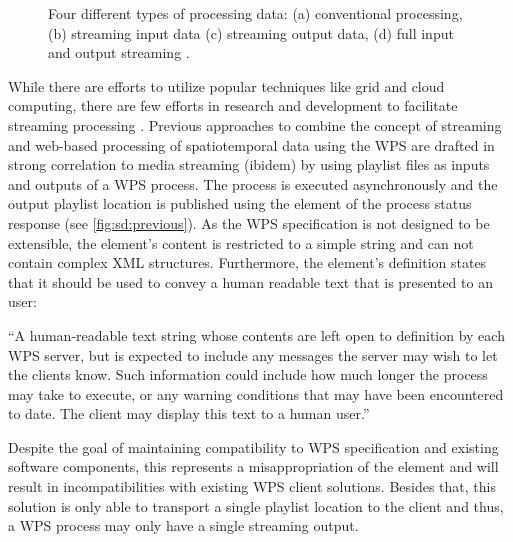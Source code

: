   \begin{figure}[!htb]
    \centering
    
    \caption{\label{fig:streaming}Four different types of processing data: (a) conventional processing, (b) streaming input data (c) streaming output data, (d) full input and output streaming \citep[based on][]{foerster2012live}.}
  \end{figure}

  While there are efforts to utilize popular techniques like grid and cloud computing, there are few efforts in research and development to facilitate streaming processing \citep{foerster2012live}. Previous approaches to combine the concept of streaming and web-based processing of spatiotemporal data using the \ac{WPS} are drafted in strong correlation to media streaming (ibidem) by using playlist files \citep{ietf:draft-pantos-http-live-streaming-12} as inputs and outputs of a \ac{WPS} process. The process is executed asynchronously and the output playlist location is published using the  element of the process status response (see \cref{fig:sd:previous}). As the \ac{WPS} specification is not designed to be extensible, the element's content is restricted to a simple string and can not contain complex \ac{XML} structures. Furthermore, the element's definition states that it should be used to convey a human readable text that is presented to an user:
  \begin{xquote}
    ``A human-readable text string whose contents are left open to definition by each WPS server, but is expected to include any messages the server may wish to let the clients know. Such information could include how much longer the process may take to execute, or any warning conditions that may have been encountered to date. The client may display this text to a human user.''
  \end{xquote}
  Despite the goal of maintaining compatibility to \ac{WPS} specification and existing software components, this represents a misappropriation of the element and will result in incompatibilities with existing \ac{WPS} client solutions. Besides that, this solution is only able to transport a single playlist location to the client and thus, a \ac{WPS} process may only have a single streaming output.

